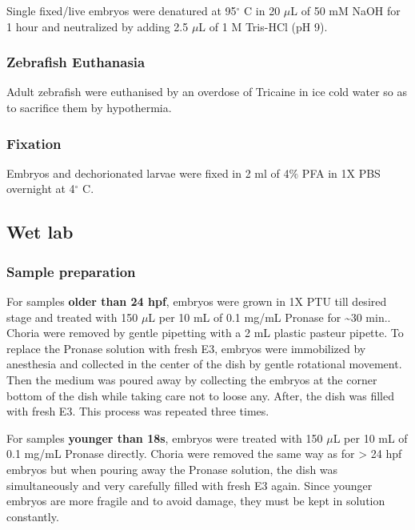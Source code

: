 \documentclass[11pt,singlespacinge,twoside]{reedthesis} %
\theoremstyle{definition}
\theoremstyle{definition}
\theoremstyle{definition}
\theoremstyle{remark}
\begin{document}
Single fixed/live embryos were denatured at 95\(^\circ\) C in 20 \(\mu\)L of 50 mM NaOH for 1 hour and neutralized by adding 2.5 \(\mu\)L of 1 M Tris-HCl (pH 9).

\hypertarget{zebrafish-euthanasia}{%
\subsubsection{Zebrafish Euthanasia}\label{zebrafish-euthanasia}}

Adult zebrafish were euthanised by an overdose of Tricaine in ice cold water so as to sacrifice them by hypothermia.

\hypertarget{fixation}{%
\subsubsection{Fixation}\label{fixation}}

Embryos and dechorionated larvae were fixed in 2 ml of 4\(\%\) PFA in 1X PBS overnight at 4\(^\circ\) C.

\hypertarget{Wet-met}{%
\subsection{Wet lab}\label{Wet-met}}

\hypertarget{sampleprep}{%
\subsubsection{Sample preparation}\label{sampleprep}}

For samples \textbf{older than 24 hpf}, embryos were grown in 1X PTU till desired stage and treated with 150 \(\mu\)L per 10 mL of 0.1 mg/mL Pronase for \textasciitilde30 min.. Choria were removed by gentle pipetting with a 2 mL plastic pasteur pipette. To replace the Pronase solution with fresh E3, embryos were immobilized by anesthesia and collected in the center of the dish by gentle rotational movement. Then the medium was poured away by collecting the embryos at the corner bottom of the dish while taking care not to loose any. After, the dish was filled with fresh E3. This process was repeated three times.

For samples \textbf{younger than 18s}, embryos were treated with 150 \(\mu\)L per 10 mL of 0.1 mg/mL Pronase directly. Choria were removed the same way as for \textgreater{} 24 hpf embryos but when pouring away the Pronase solution, the dish was simultaneously and very carefully filled with fresh E3 again. Since younger embryos are more fragile and to avoid damage, they must be kept in solution constantly.
\end{document}
